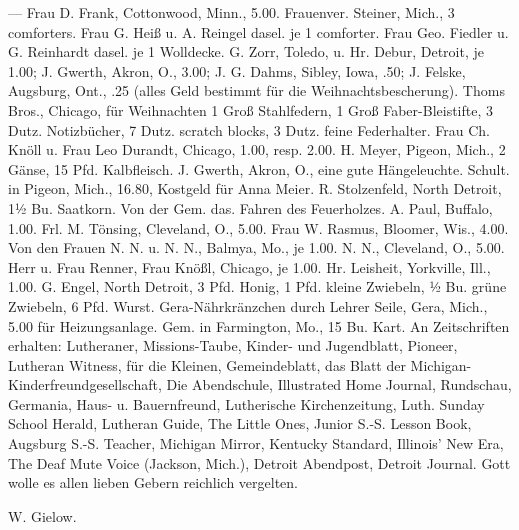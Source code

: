 — Frau D. Frank, Cottonwood, Minn., 5.00. Frauenver. Steiner, Mich., 3 comforters. Frau G. Heiß u. A. Reingel dasel. je 1 comforter. Frau Geo. Fiedler u. G. Reinhardt dasel. je 1 Wolldecke. G. Zorr, Toledo, u. Hr. Debur, Detroit, je 1.00; J. Gwerth, Akron, O., 3.00; J. G. Dahms, Sibley, Iowa, .50; J. Felske, Augsburg, Ont., .25 (alles Geld bestimmt für die Weihnachtsbescherung). Thoms Bros., Chicago, für Weihnachten 1 Groß Stahlfedern, 1 Groß Faber-Bleistifte, 3 Dutz. Notizbücher, 7 Dutz. scratch blocks, 3 Dutz. feine Federhalter. Frau Ch. Knöll u. Frau Leo Durandt, Chicago, 1.00, resp. 2.00. H. Meyer, Pigeon, Mich., 2 Gänse, 15 Pfd. Kalbfleisch. J. Gwerth, Akron, O., eine gute Hängeleuchte. Schult. in Pigeon, Mich., 16.80, Kostgeld für Anna Meier. R. Stolzenfeld, North Detroit, 1½ Bu. Saatkorn. Von der Gem. das. Fahren des Feuerholzes.
A. Paul, Buffalo, 1.00. Frl. M. Tönsing, Cleveland, O., 5.00. Frau W. Rasmus, Bloomer, Wis., 4.00. Von den Frauen N. N. u. N. N., Balmya, Mo., je 1.00. N. N., Cleveland, O., 5.00. Herr u. Frau Renner, Frau Knößl, Chicago, je 1.00. Hr. Leisheit, Yorkville, Ill., 1.00. G. Engel, North Detroit, 3 Pfd. Honig, 1 Pfd. kleine Zwiebeln, ½ Bu. grüne Zwiebeln, 6 Pfd. Wurst. Gera-Nährkränzchen durch Lehrer Seile, Gera, Mich., 5.00 für Heizungsanlage. Gem. in Farmington, Mo., 15 Bu. Kart. An Zeitschriften erhalten: Lutheraner, Missions-Taube, Kinder- und Jugendblatt, Pioneer, Lutheran Witness, für die Kleinen, Gemeindeblatt, das Blatt der Michigan-Kinderfreundgesellschaft, Die Abendschule, Illustrated Home Journal, Rundschau, Germania, Haus- u. Bauernfreund, Lutherische Kirchenzeitung, Luth. Sunday School Herald, Lutheran Guide, The Little Ones, Junior S.-S. Lesson Book, Augsburg S.-S. Teacher, Michigan Mirror, Kentucky Standard, Illinois’ New Era, The Deaf Mute Voice (Jackson, Mich.), Detroit Abendpost, Detroit Journal. Gott wolle es allen lieben Gebern reichlich vergelten.

W. Gielow.
